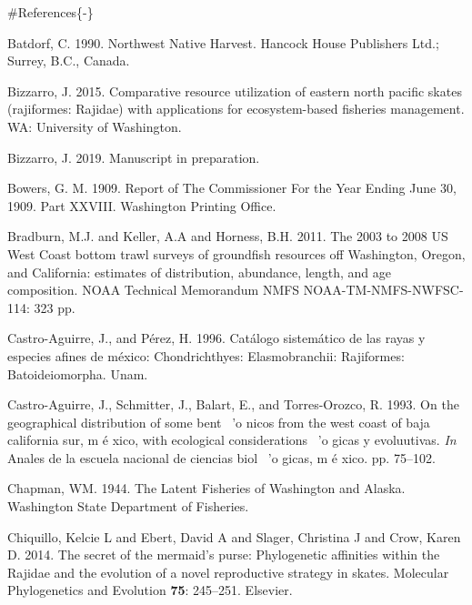 \documentclass[12pt,]{article}
\begin{document}
\color{black}

\#References\{-\}

\renewcommand{\thepage}{}

\hypertarget{refs}{}
\leavevmode\hypertarget{ref-Batdorf1990}{}%
Batdorf, C. 1990. Northwest Native Harvest. Hancock House Publishers
Ltd.; Surrey, B.C., Canada.

\leavevmode\hypertarget{ref-Bizzarro2015}{}%
Bizzarro, J. 2015. Comparative resource utilization of eastern north
pacific skates (rajiformes: Rajidae) with applications for
ecosystem-based fisheries management. WA: University of Washington.

\leavevmode\hypertarget{ref-Bizzarro2019}{}%
Bizzarro, J. 2019. Manuscript in preparation.

\leavevmode\hypertarget{ref-Bowers1909}{}%
Bowers, G. M. 1909. Report of The Commissioner For the Year Ending June
30, 1909. Part XXVIII. Washington Printing Office.

\leavevmode\hypertarget{ref-Bradburn2011}{}%
Bradburn, M.J. and Keller, A.A and Horness, B.H. 2011. The 2003 to 2008
US West Coast bottom trawl surveys of groundfish resources off
Washington, Oregon, and California: estimates of distribution,
abundance, length, and age composition. NOAA Technical Memorandum NMFS
NOAA-TM-NMFS-NWFSC-114: 323 pp.

\leavevmode\hypertarget{ref-Castro1996}{}%
Castro-Aguirre, J., and Pérez, H. 1996. Catálogo sistemático de las
rayas y especies afines de méxico: Chondrichthyes: Elasmobranchii:
Rajiformes: Batoideiomorpha. Unam.

\leavevmode\hypertarget{ref-Castro1993}{}%
Castro-Aguirre, J., Schmitter, J., Balart, E., and Torres-Orozco, R.
1993. On the geographical distribution of some bent ~'o nicos from the
west coast of baja california sur, m é xico, with ecological
considerations ~'o gicas y evoluutivas. \emph{In} Anales de la escuela
nacional de ciencias biol ~'o gicas, m é xico. pp. 75--102.

\leavevmode\hypertarget{ref-Chapman1944}{}%
Chapman, WM. 1944. The Latent Fisheries of Washington and Alaska.
Washington State Department of Fisheries.

\leavevmode\hypertarget{ref-Chiquillo2014}{}%
Chiquillo, Kelcie L and Ebert, David A and Slager, Christina J and Crow,
Karen D. 2014. The secret of the mermaid's purse: Phylogenetic
affinities within the Rajidae and the evolution of a novel reproductive
strategy in skates. Molecular Phylogenetics and Evolution \textbf{75}:
245--251. Elsevier.
\end{document}
